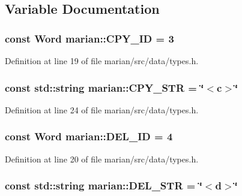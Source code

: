 \subsection{Variable Documentation}
\subsubsection[{\texorpdfstring{C\+P\+Y\+\_\+\+ID}{CPY_ID}}]{\setlength{\rightskip}{0pt plus 5cm}const {\bf Word} marian\+::\+C\+P\+Y\+\_\+\+ID = 3}\hypertarget{namespacemarian_a332a04943d2fc4bba824afc099e46190}{}\label{namespacemarian_a332a04943d2fc4bba824afc099e46190}


Definition at line 19 of file marian/src/data/types.\+h.

\subsubsection[{\texorpdfstring{C\+P\+Y\+\_\+\+S\+TR}{CPY_STR}}]{\setlength{\rightskip}{0pt plus 5cm}const std\+::string marian\+::\+C\+P\+Y\+\_\+\+S\+TR = \char`\"{}$<$c$>$\char`\"{}}\hypertarget{namespacemarian_aafe70f6fe2652d0c8712f08bc4e2c8f6}{}\label{namespacemarian_aafe70f6fe2652d0c8712f08bc4e2c8f6}


Definition at line 24 of file marian/src/data/types.\+h.

\subsubsection[{\texorpdfstring{D\+E\+L\+\_\+\+ID}{DEL_ID}}]{\setlength{\rightskip}{0pt plus 5cm}const {\bf Word} marian\+::\+D\+E\+L\+\_\+\+ID = 4}\hypertarget{namespacemarian_a3602e294027f4df7aeba04dd25e83db6}{}\label{namespacemarian_a3602e294027f4df7aeba04dd25e83db6}


Definition at line 20 of file marian/src/data/types.\+h.

\subsubsection[{\texorpdfstring{D\+E\+L\+\_\+\+S\+TR}{DEL_STR}}]{\setlength{\rightskip}{0pt plus 5cm}const std\+::string marian\+::\+D\+E\+L\+\_\+\+S\+TR = \char`\"{}$<$d$>$\char`\"{}}\hypertarget{namespacemarian_aa9c98f79752cd2294cae93a90ffcf9d3}{}\label{namespacemarian_aa9c98f79752cd2294cae93a90ffcf9d3}


